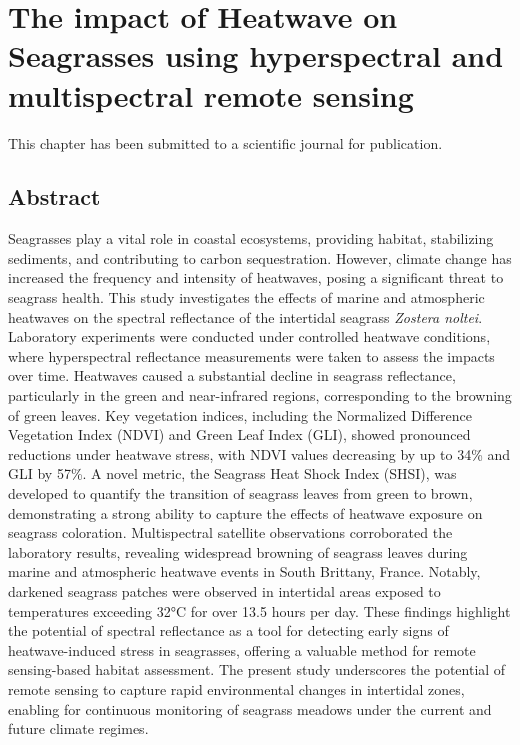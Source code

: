 \documentclass[
  letterpaper,
  11pt,
  english,
  singlespacing,
  headsepline]{MastersDoctoralThesis}
\begin{document}

\chapter{The impact of Heatwave on Seagrasses using hyperspectral and
multispectral remote
sensing}\label{the-impact-of-heatwave-on-seagrasses-using-hyperspectral-and-multispectral-remote-sensing}

This chapter has been submitted to a scientific journal for publication.

\vspace{0.5cm}

\section*{Abstract}\label{abstract-3}


Seagrasses play a vital role in coastal ecosystems, providing habitat,
stabilizing sediments, and contributing to carbon sequestration.
However, climate change has increased the frequency and intensity of
heatwaves, posing a significant threat to seagrass health. This study
investigates the effects of marine and atmospheric heatwaves on the
spectral reflectance of the intertidal seagrass \emph{Zostera noltei}.
Laboratory experiments were conducted under controlled heatwave
conditions, where hyperspectral reflectance measurements were taken to
assess the impacts over time. Heatwaves caused a substantial decline in
seagrass reflectance, particularly in the green and near-infrared
regions, corresponding to the browning of green leaves. Key vegetation
indices, including the Normalized Difference Vegetation Index (NDVI) and
Green Leaf Index (GLI), showed pronounced reductions under heatwave
stress, with NDVI values decreasing by up to 34\% and GLI by 57\%. A
novel metric, the Seagrass Heat Shock Index (SHSI), was developed to
quantify the transition of seagrass leaves from green to brown,
demonstrating a strong ability to capture the effects of heatwave
exposure on seagrass coloration. Multispectral satellite observations
corroborated the laboratory results, revealing widespread browning of
seagrass leaves during marine and atmospheric heatwave events in South
Brittany, France. Notably, darkened seagrass patches were observed in
intertidal areas exposed to temperatures exceeding 32°C for over 13.5
hours per day. These findings highlight the potential of spectral
reflectance as a tool for detecting early signs of heatwave-induced
stress in seagrasses, offering a valuable method for remote
sensing-based habitat assessment. The present study underscores the
potential of remote sensing to capture rapid environmental changes in
intertidal zones, enabling for continuous monitoring of seagrass meadows
under the current and future climate regimes.
\end{document}
